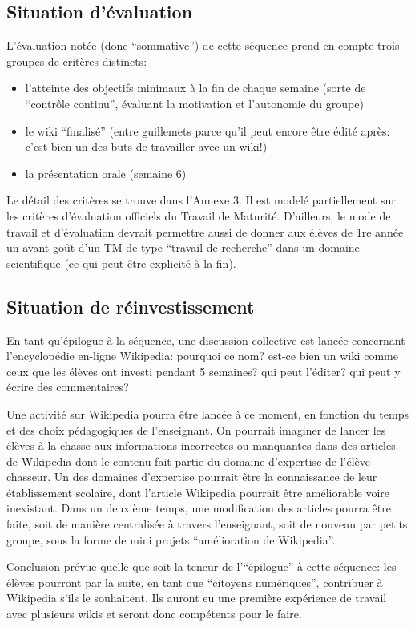 \documentclass[11pt,bibliography=totoc]{scrartcl}
\begin{document}
\subsection{Situation d'évaluation}
L'évaluation notée (donc ``sommative'') de cette séquence prend en compte trois
groupes de critères distincts:
\begin{itemize}
\item l'atteinte des objectifs minimaux à la fin de chaque semaine (sorte de
  ``contrôle continu'', évaluant la motivation et l'autonomie du groupe)
\item le wiki ``finalisé'' (entre guillemets parce qu'il peut encore être édité
  après: c'est bien un des buts de travailler avec un wiki!)
\item la présentation orale (semaine 6)
\end{itemize}
Le détail des critères se trouve dans l'Annexe 3. Il est modelé partiellement
sur les critères d'évaluation officiels du Travail de Maturité. D'ailleurs, le
mode de travail et d'évaluation devrait permettre aussi de donner aux élèves de
1re année un avant-goût d'un TM de type ``travail de recherche'' dans un domaine
scientifique (ce qui peut être explicité à la fin).

\subsection{Situation de réinvestissement}
En tant qu'épilogue à la séquence, une discussion collective est lancée
concernant l'encyclopédie en-ligne Wikipedia: pourquoi ce nom? est-ce bien un
wiki comme ceux que les élèves ont investi pendant 5 semaines? qui peut
l'éditer? qui peut y écrire des commentaires?

Une activité sur Wikipedia pourra être lancée à ce moment, en fonction du temps
et des choix pédagogiques de l'enseignant.  On pourrait imaginer de lancer les
élèves à la chasse aux informations incorrectes ou manquantes dans des articles
de Wikipedia dont le contenu fait partie du domaine d'expertise de l'élève
chasseur. Un des domaines d'expertise pourrait être la connaissance de leur
établissement scolaire, dont l'article Wikipedia pourrait être améliorable voire
inexistant.  Dans un deuxième temps, une modification des articles pourra être
faite, soit de manière centralisée à travers l'enseignant, soit de nouveau par
petits groupe, sous la forme de mini projets ``amélioration de Wikipedia''.

Conclusion prévue quelle que soit la teneur de l'``épilogue'' à cette séquence:
les élèves pourront par la suite, en tant que ``citoyens numériques'',
contribuer à Wikipedia s'ils le souhaitent. Ils auront eu une première
expérience de travail avec plusieurs wikis et seront donc compétents pour le
faire.
\end{document}
